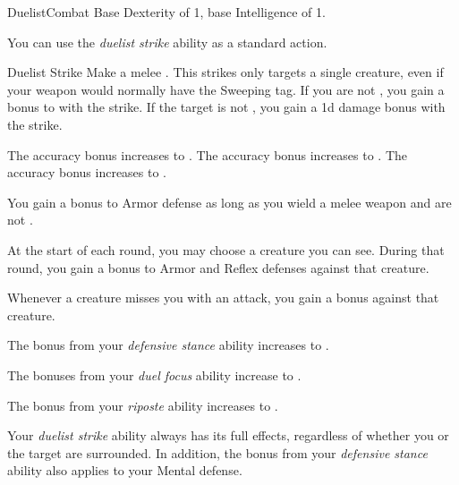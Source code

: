     \begin{feat}{Duelist}{Combat}
        \featpre Base Dexterity of 1, base Intelligence of 1.

         You can use the \textit{duelist strike} ability as a standard action.
        \begin{freeability}{Duelist Strike}
            Make a melee .
            This strikes only targets a single creature, even if your weapon would normally have the Sweeping tag.
            If you are not \surrounded, you gain a  bonus to  with the strike.
            If the target is not \surrounded, you gain a \plus1d damage bonus with the strike.

            \rankline
             The accuracy bonus increases to .
             The accuracy bonus increases to .
             The accuracy bonus increases to .
        \end{freeability}

         You gain a  bonus to Armor defense as long as you wield a melee weapon and are not \surrounded.

         At the start of each round, you may choose a creature you can see.
        During that round, you gain a  bonus to Armor and Reflex defenses against that creature.

         Whenever a creature misses you with an attack, you  gain a   bonus against that creature.

         The bonus from your \textit{defensive stance} ability increases to .

         The bonuses from your \textit{duel focus} ability increase to .

         The bonus from your \textit{riposte} ability increases to .

         Your \textit{duelist strike} ability always has its full effects, regardless of whether you or the target are surrounded.
        In addition, the bonus from your \textit{defensive stance} ability also applies to your Mental defense.
    \end{feat}

